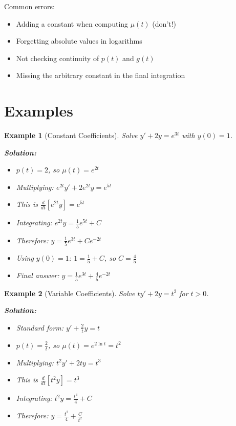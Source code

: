 \documentclass[12pt]{article}
\newtheorem{example}{Example}
\begin{document}
\begin{warning}
Common errors:
\begin{itemize}
\item Adding a constant when computing $\mu(t)$ (don't!)
\item Forgetting absolute values in logarithms
\item Not checking continuity of $p(t)$ and $g(t)$
\item Missing the arbitrary constant in the final integration
\end{itemize}
\end{warning}

\section{Examples}

\begin{example}[Constant Coefficients]
Solve $y' + 2y = e^{3t}$ with $y(0) = 1$.

\textbf{Solution:}
\begin{itemize}
\item $p(t) = 2$, so $\mu(t) = e^{2t}$
\item Multiplying: $e^{2t}y' + 2e^{2t}y = e^{5t}$
\item This is $\frac{d}{dt}[e^{2t}y] = e^{5t}$
\item Integrating: $e^{2t}y = \frac{1}{5}e^{5t} + C$
\item Therefore: $y = \frac{1}{5}e^{3t} + Ce^{-2t}$
\item Using $y(0) = 1$: $1 = \frac{1}{5} + C$, so $C = \frac{4}{5}$
\item Final answer: $y = \frac{1}{5}e^{3t} + \frac{4}{5}e^{-2t}$
\end{itemize}
\end{example}

\begin{example}[Variable Coefficients]
Solve $ty' + 2y = t^2$ for $t > 0$.

\textbf{Solution:}
\begin{itemize}
\item Standard form: $y' + \frac{2}{t}y = t$
\item $p(t) = \frac{2}{t}$, so $\mu(t) = e^{2\ln t} = t^2$
\item Multiplying: $t^2y' + 2ty = t^3$
\item This is $\frac{d}{dt}[t^2y] = t^3$
\item Integrating: $t^2y = \frac{t^4}{4} + C$
\item Therefore: $y = \frac{t^2}{4} + \frac{C}{t^2}$
\end{itemize}
\end{example}
\end{document}
